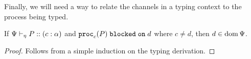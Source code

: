 Finally, we will need a way to relate the channels in a typing context to the process being typed.

\begin{lemma}
  \label{algorithmic:channel-in-context}
If ${\Psi} \vdash_{\eta} P :: (c : \alpha)$ and ${\mathtt{proc}_{c}(P)}\;\mathtt{blocked\;on}\;{d}$ where $c \neq d$, then $d \in \operatorname{dom}\Psi$.
\end{lemma}
\begin{proof}
  Follows from a simple induction on the typing derivation.
\end{proof}

